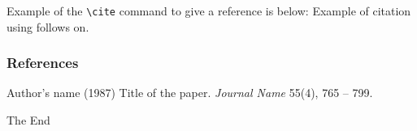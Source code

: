 \documentclass{beamer}
\begin{document}
\begin{frame}[fragile]  %
Example of the \verb|\cite| command to give a reference is below:
Example of citation using \cite{key1} follows on.
\end{frame}
 
\begin{frame}
\frametitle{References}
\footnotesize{
\begin{thebibliography}{99}
  Author's name (1987)
 \newblock Title of the paper.
 \newblock \emph{Journal Name} 55(4), 765 -- 799.
\end{thebibliography}
}
\end{frame}
 
\begin{frame}
\centerline{The End}
\end{frame}
\end{document}
